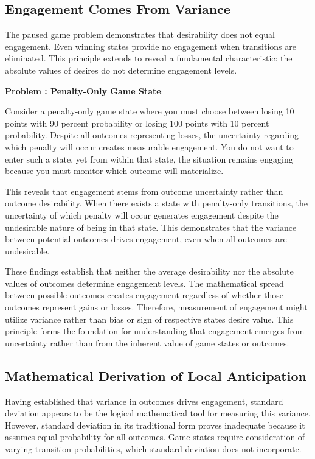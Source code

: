 \documentclass{article}
\newcounter{gameproblem}
\newenvironment{gameproblem}[1]{%
    \refstepcounter{gameproblem}%
    \noindent\textbf{Problem \thegameproblem: #1}: %
}{%
    \par\smallskip%
}
\begin{document}
\subsection{Engagement Comes From Variance}

The paused game problem demonstrates that desirability does not equal engagement. Even winning states provide no engagement when transitions are eliminated. This principle extends to reveal a fundamental characteristic: the absolute values of desires do not determine engagement levels.

\begin{gameproblem}{Penalty-Only Game State}
Consider a penalty-only game state where you must choose between losing 10 points with 90 percent probability or losing 100 points with 10 percent probability. Despite all outcomes representing losses, the uncertainty regarding which penalty will occur creates measurable engagement. You do not want to enter such a state, yet from within that state, the situation remains engaging because you must monitor which outcome will materialize.
\end{gameproblem}

This reveals that engagement stems from outcome uncertainty rather than outcome desirability. When there exists a state with penalty-only transitions, the uncertainty of which penalty will occur generates engagement despite the undesirable nature of being in that state. This demonstrates that the variance between potential outcomes drives engagement, even when all outcomes are undesirable.

These findings establish that neither the average desirability nor the absolute values of outcomes determine engagement levels. The mathematical spread between possible outcomes creates engagement regardless of whether those outcomes represent gains or losses. Therefore, measurement of engagement might utilize variance rather than bias or sign of respective states desire value. This principle forms the foundation for understanding that engagement emerges from uncertainty rather than from the inherent value of game states or outcomes.

\subsection{Mathematical Derivation of Local Anticipation}

Having established that variance in outcomes drives engagement, standard deviation appears to be the logical mathematical tool for measuring this variance. However, standard deviation in its traditional form proves inadequate because it assumes equal probability for all outcomes. Game states require consideration of varying transition probabilities, which standard deviation does not incorporate.
\end{document}
